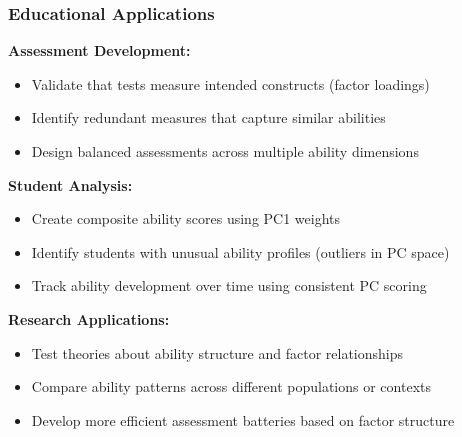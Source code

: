 \documentclass[aspectratio=169]{beamer}
\begin{document}
\begin{frame}
    \frametitle{Educational Applications}
    \textbf{Assessment Development:}
    \begin{itemize}
        \item Validate that tests measure intended constructs (factor loadings) \pause
        \item Identify redundant measures that capture similar abilities \pause
        \item Design balanced assessments across multiple ability dimensions \pause
    \end{itemize}
    \vspace{6pt}
    \textbf{Student Analysis:}
    \begin{itemize}
        \item Create composite ability scores using PC1 weights \pause
        \item Identify students with unusual ability profiles (outliers in PC space) \pause
        \item Track ability development over time using consistent PC scoring \pause
    \end{itemize}
    \vspace{6pt}
    \textbf{Research Applications:}
    \begin{itemize}
        \item Test theories about ability structure and factor relationships \pause
        \item Compare ability patterns across different populations or contexts \pause
        \item Develop more efficient assessment batteries based on factor structure \pause
    \end{itemize}
\end{frame}
\end{document}
